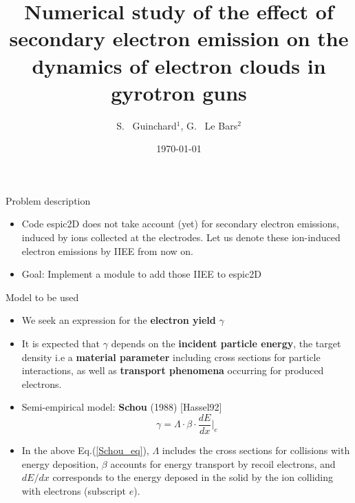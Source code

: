 \documentclass[aspectratio=169,xcolor=dvipsnames,8pt]{beamer}
\title[Summary]{Numerical study of the effect of secondary electron emission on the dynamics of electron clouds in gyrotron guns}
\author[S.Guinchard] {S. ~Guinchard$^{1}$, G. ~Le Bars$^{2}$}
\institute[SPH] %
{
    $^1$ Ecole Polytechnique Fédérale de Lausanne (EPFL), Physics Section (SPH), CH-1015 Lausanne, Switzerland\\
    $^2$ Ecole Polytechnique Fédérale de Lausanne (EPFL), Swiss Plasma Center (SPC), CH-1015 Lausanne, Switzerland\\
    \vspace{1cm}
}
\date{\today} %
\newcommand{\beq}{\begin{equation}}
\newcommand{\eeq}{\end{equation}}
\begin{document}
\begin{frame}
    \titlepage
\end{frame}


\begin{frame}{Problem description}

\begin{itemize}


\item{Code espic2D does not take account (yet) for secondary electron emissions, induced by ions collected at the electrodes. Let us denote these ion-induced electron emissions by IIEE from now on.
}
\item{Goal: Implement a module to add those IIEE to espic2D 
}
\end{itemize}
\end{frame}


\begin{frame}{Model to be used}

\begin{itemize}


\item{We seek an expression for the \textbf{electron yield} $\gamma$ 
}
\item{It is expected that $\gamma$ depends on the \textbf{incident particle energy}, the target density i.e a \textbf{material parameter} including cross sections for particle interactions, as well as \textbf{transport phenomena} occurring for produced electrons.
}

\item{ Semi-empirical model: \textbf{Schou} (1988) [Hassel92]
\beq
\gamma = \Lambda\cdot \beta \cdot \frac{dE}{dx}\Bigg|_{e}\label{Schou_eq}
\eeq
}

\item{In the above Eq.(\ref{Schou_eq}), $\Lambda$ includes the cross sections for collisions with energy deposition, $\beta$ accounts for energy transport by recoil electrons, and $dE/dx$ corresponds to the energy deposed in the solid by the ion colliding with electrons (subscript $e$).
}

\end{itemize}

\end{frame}
\end{document}
